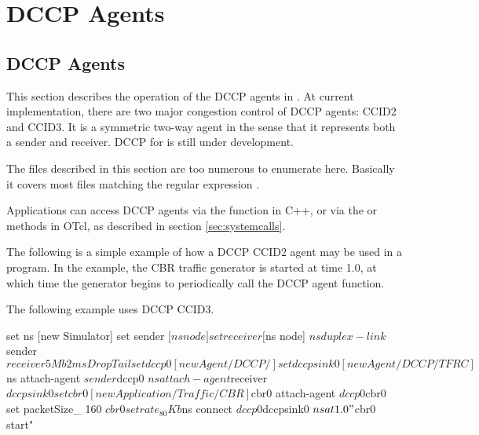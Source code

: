 \chapter{DCCP Agents}
\label{sec:dccpAgents}

\section{DCCP Agents}
\label{sec:dccpagent}
This section describes the operation of the DCCP agents in \ns.
At current \ns implementation, there are two major congestion 
control of DCCP agents: CCID2 and CCID3.
It is a symmetric two-way agent in the sense that it represents
both a sender and receiver.
DCCP for \ns is still under development.

The files described in this section are too numerous to enumerate here.
Basically it covers most files matching the regular expression
.

Applications can access DCCP agents via the  function in C++,
or via the  or  methods in OTcl, as described in
section \ref{sec:systemcalls}.  

The following is a simple example of how a DCCP CCID2 agent may be used in a program.  
In the example, the CBR traffic generator is started at time 1.0, at which time
the generator begins to periodically call the DCCP agent 
function.


The following example uses DCCP CCID3.
\begin{program}
        set ns [new Simulator]
        set sender [$ns node]
        set receiver [$ns node]
        $ns duplex-link $sender $receiver 5Mb 2ms DropTail

        set dccp0 [new Agent/DCCP/]
        set dccpsink0 [new Agent/DCCP/TFRC]
        $ns attach-agent $sender $dccp0
        $ns attach-agent $receiver $dccpsink0
      
        set cbr0 [new Application/Traffic/CBR]
        $cbr0 attach-agent $dccp0
        $cbr0 set packetSize_ 160
        $cbr0 set rate_ 80Kb

        $ns connect $dccp0 $dccpsink0
        $ns at 1.0 "$cbr0 start"
\end{program}

